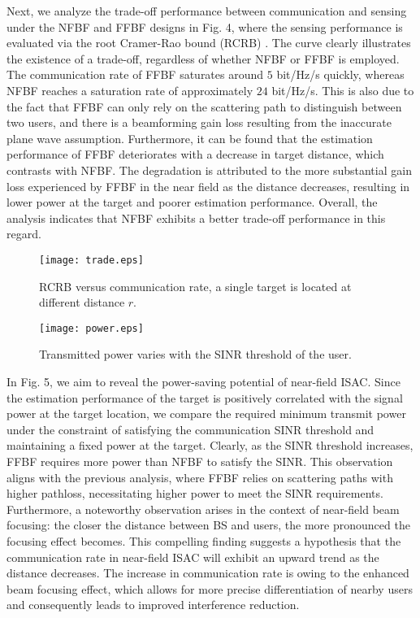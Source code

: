 \documentclass[10pt,journal,twocolumn,twoside]{IEEEtran} %
\begin{document}
 Next, we analyze the trade-off performance between communication and sensing under the NFBF and FFBF designs in Fig. 4, where the sensing performance is evaluated via the root Cramer-Rao bound (RCRB) .
 The curve clearly illustrates the existence of a trade-off, regardless of whether NFBF or FFBF is employed.
 The communication rate of FFBF saturates around $5$ bit/Hz/s quickly, whereas NFBF reaches a saturation rate of approximately $24$ bit/Hz/s.
This is also due to the fact that FFBF can only rely on the scattering path to distinguish between two users, and there is a beamforming gain loss resulting from the inaccurate plane wave assumption.
Furthermore, it can be found that the estimation performance of FFBF deteriorates with a decrease in target distance, which contrasts with NFBF. The degradation is attributed to the more substantial gain loss experienced by FFBF in the near field as the distance decreases, resulting in lower power at the target and poorer estimation performance. Overall, the analysis indicates that NFBF exhibits a better trade-off performance in this regard.
 

\begin{figure}[t]
       \centering
       \texttt{[image: trade.eps]}
       \caption{RCRB versus communication rate, a single target is located at different distance $r$.}
       \label{fig3}
\end{figure}
\begin{figure}[t]
       \centering
       \texttt{[image: power.eps]}
       \caption{Transmitted power varies with the SINR threshold of the user.}
       \label{fig4}
\end{figure}

In Fig. 5, we aim to reveal the power-saving potential of near-field ISAC. 
Since the estimation performance of the target is positively correlated with the signal power at the target location, we compare the required minimum transmit power under the constraint of satisfying the communication SINR threshold and maintaining a fixed power at the target. 
 Clearly, as the SINR threshold increases, FFBF requires more power than NFBF to satisfy the SINR. This observation aligns with the previous analysis, where FFBF relies on scattering paths with higher pathloss, necessitating higher power to meet the SINR requirements.
 Furthermore, a noteworthy observation arises in the context of near-field beam focusing: the closer the distance between BS and users, the more pronounced the focusing effect becomes. This compelling finding suggests a hypothesis that the communication rate in near-field ISAC will exhibit an upward trend as the distance decreases. The increase in communication rate is owing to the enhanced beam focusing effect, which allows for more precise differentiation of nearby users and consequently leads to improved interference reduction.
\end{document}
